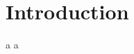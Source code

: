 \documentclass[../main.tex]{subfiles}
\begin{document}
\footnotesize
\section{Introduction}

a\cite{TestRef} a

\lipsum[2-4]
\end{document}
